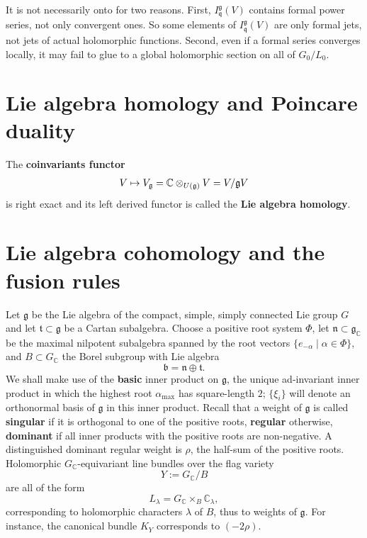 \documentclass[12pt]{article}
\begin{document}
\begin{example}
It is not necessarily onto for two reasons. First, $I_{\mathfrak q}^{\mathfrak g}(V)$ contains formal power series, not only convergent ones. So some elements of $I_{\mathfrak q}^{\mathfrak g}(V)$ are only formal jets, not jets of actual holomorphic functions. Second, even if a formal series converges locally, it may fail to glue to a global holomorphic section on all of $G_0/L_0$.


\end{example}

\section{Lie algebra homology and Poincare duality}
The \textbf{coinvariants functor} \begin{align*}
    V\mapsto V_{\mathfrak g}=\mathbb{C}\otimes_{U(\mathfrak g)} V = V/\mathfrak g V
\end{align*} is right exact and its left derived functor is called the \textbf{Lie algebra homology}. 

\begin{theorem}
\end{theorem}

\section{Lie algebra cohomology and the fusion rules}
Let \(\mathfrak g\) be the Lie algebra of the compact, simple, simply connected Lie group \(G\) and let \(\mathfrak t \subset \mathfrak g\) be a Cartan subalgebra. Choose a positive root system \(\Phi\), let \(\mathfrak n \subset \mathfrak g_{\mathbb C}\) be the maximal nilpotent subalgebra spanned by the root vectors \(\{e_{-\alpha}\mid \alpha\in \Phi\}\), and \(B \subset G_{\mathbb C}\) the Borel subgroup with Lie algebra
\[
\mathfrak b=\mathfrak n\oplus \mathfrak t .
\]
We shall make use of the \textbf{basic} inner product on \(\mathfrak g\), the unique ad-invariant inner product in which the highest root \(\alpha_{\max}\) has square-length \(2\); \(\{\xi_i\}\) will denote an orthonormal basis of \(\mathfrak g\) in this inner product. Recall that a weight of \(\mathfrak g\) is called \textbf{singular} if it is orthogonal to one of the positive roots, \textbf{regular} otherwise, \textbf{dominant} if all inner products with the positive roots are non-negative. A distinguished dominant regular weight is \(\rho\), the half-sum of the positive roots. Holomorphic \(G_{\mathbb C}\)-equivariant line bundles over the flag variety
\[
Y:=G_{\mathbb C}/B
\]
are all of the form
\[
L_\lambda = G_{\mathbb C}\times_B \mathbb C_\lambda,
\]
corresponding to holomorphic characters \(\lambda\) of \(B\), thus to weights of \(\mathfrak g\). For instance, the canonical bundle \(K_Y\) corresponds to \((-2\rho)\). 
\end{document}
